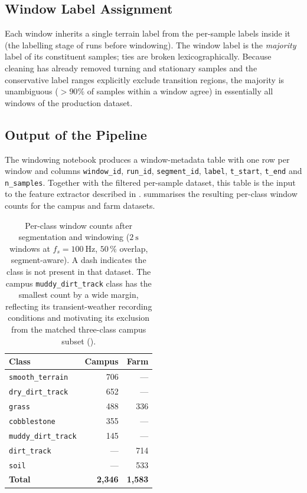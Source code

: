 \subsection{Window Label Assignment}

Each window inherits a single terrain label from the per-sample labels inside it (the labelling stage of  runs before windowing). The window label is the \emph{majority} label of its constituent samples; ties are broken lexicographically. Because cleaning has already removed turning and stationary samples and the conservative label ranges explicitly exclude transition regions, the majority is unambiguous ($>\!90\%$ of samples within a window agree) in essentially all windows of the production dataset.

\subsection{Output of the Pipeline}

The windowing notebook produces a window-metadata table with one row per window and columns \texttt{window\_id}, \texttt{run\_id}, \texttt{segment\_id}, \texttt{label}, \texttt{t\_start}, \texttt{t\_end} and \texttt{n\_samples}. Together with the filtered per-sample dataset, this table is the input to the feature extractor described in .  summarises the resulting per-class window counts for the campus and farm datasets.

\begin{table}[H]
\centering
\caption{Per-class window counts after segmentation and windowing ($\SI{2}{\second}$ windows at $f_s = \SI{100}{\hertz}$, $50\,\%$ overlap, segment-aware). A dash indicates the class is not present in that dataset. The campus \texttt{muddy\_dirt\_track} class has the smallest count by a wide margin, reflecting its transient-weather recording conditions and motivating its exclusion from the matched three-class campus subset ().}
\label{tab:window_counts}
\renewcommand{\arraystretch}{1.15}
\begin{tabular}{lrr}
\toprule
\textbf{Class} & \textbf{Campus} & \textbf{Farm} \\
\midrule
\texttt{smooth\_terrain}    & 706 & --- \\
\texttt{dry\_dirt\_track}   & 652 & --- \\
\texttt{grass}              & 488 & 336 \\
\texttt{cobblestone}        & 355 & --- \\
\texttt{muddy\_dirt\_track} & 145 & --- \\
\texttt{dirt\_track}        & --- & 714 \\
\texttt{soil}               & --- & 533 \\
\midrule
\textbf{Total}              & \textbf{2{,}346} & \textbf{1{,}583} \\
\bottomrule
\end{tabular}
\end{table}

